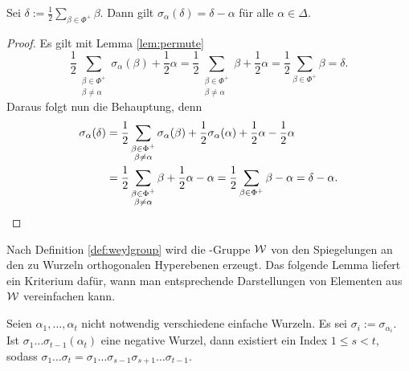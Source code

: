 \begin{cor}
  \label{cor:sigmaDelta}
  Sei $\delta := \tfrac{1}{2} \sum_{\beta \in \Phi^+} \beta$.
  Dann gilt $\sigma_\alpha(\delta) = \delta - \alpha$ für alle $\alpha \in \Delta$.
\end{cor}

\begin{proof}
  Es gilt mit Lemma \ref{lem:permute}
  \begin{displaymath}
    \frac{1}{2} \sum_{\substack{\beta \in \Phi^+\\ \beta \neq \alpha}} \sigma_\alpha(\beta) + \frac{1}{2}\alpha 
  = \frac{1}{2} \sum_{\substack{\beta \in \Phi^+\\ \beta \neq \alpha}} \beta + \frac{1}{2}\alpha
  = \frac{1}{2} \sum_{\beta \in \Phi^+} \beta
  = \delta.
  \end{displaymath}
  Daraus folgt nun die Behauptung, denn
  \begin{align*}
    \sigma_\alpha(\delta) 
    &= \frac{1}{2} \sum_{\substack{\beta \in \Phi^+\\ \beta \neq \alpha}} \sigma_\alpha(\beta) + \frac{1}{2} \sigma_\alpha(\alpha) + \frac{1}{2} \alpha - \frac{1}{2} \alpha \\
    &= \frac{1}{2} \sum_{\substack{\beta \in \Phi^+\\ \beta \neq \alpha}} \beta + \frac{1}{2} \alpha - \alpha 
    = \frac{1}{2} \sum_{\beta \in \Phi^+} \beta - \alpha 
    = \delta - \alpha. \qedhere
  \end{align*}
\end{proof}

Nach Definition \ref{def:weylgroup} wird die \weyl\hyp{}Gruppe $\mathcal{W}$ von den Spiegelungen an den zu Wurzeln orthogonalen Hyperebenen erzeugt.
Das folgende Lemma liefert ein Kriterium dafür, wann man entsprechende Darstellungen von Elementen aus $\mathcal{W}$ vereinfachen kann.

\begin{lem}
  \label{lem:simplify}
  Seien $\alpha_1,\dots,\alpha_t$ nicht notwendig verschiedene einfache Wurzeln. Es sei $\sigma_i := \sigma_{\alpha_i}$.
  Ist $\sigma_1 \dots \sigma_{t-1}(\alpha_t)$ eine negative Wurzel, dann existiert ein Index $1 \leq s < t$, sodass $\sigma_1 \dots \sigma_t = \sigma_1 \dots \sigma_{s-1} \sigma_{s+1} \dots \sigma_{t-1}$.
\end{lem}

